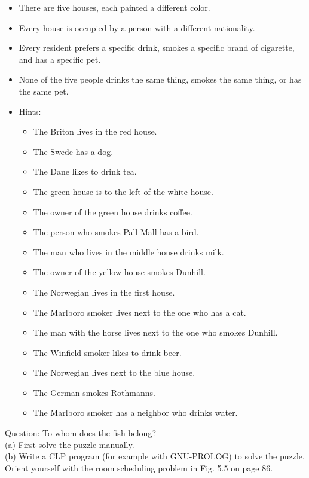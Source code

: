 \documentclass[10pt]{book}
\begin{document}
\begin{itemize}
  \item There are five houses, each painted a different color.
  \item Every house is occupied by a person with a different nationality.
  \item Every resident prefers a specific drink, smokes a specific brand of cigarette, and has a specific pet.
  \item None of the five people drinks the same thing, smokes the same thing, or has the same pet.
  \item Hints:
  \begin{itemize}
    \item The Briton lives in the red house.
    \item The Swede has a dog.
    \item The Dane likes to drink tea.
    \item The green house is to the left of the white house.
    \item The owner of the green house drinks coffee.
    \item The person who smokes Pall Mall has a bird.
    \item The man who lives in the middle house drinks milk.
    \item The owner of the yellow house smokes Dunhill.
    \item The Norwegian lives in the first house.
    \item The Marlboro smoker lives next to the one who has a cat.
    \item The man with the horse lives next to the one who smokes Dunhill.
    \item The Winfield smoker likes to drink beer.
    \item The Norwegian lives next to the blue house.
    \item The German smokes Rothmanns.
    \item The Marlboro smoker has a neighbor who drinks water.
  \end{itemize}
\end{itemize}
Question: To whom does the fish belong?\\
(a) First solve the puzzle manually.\\
(b) Write a CLP program (for example with GNU-PROLOG) to solve the puzzle. Orient yourself with the room scheduling problem in Fig. 5.5 on page 86.
\end{document}
